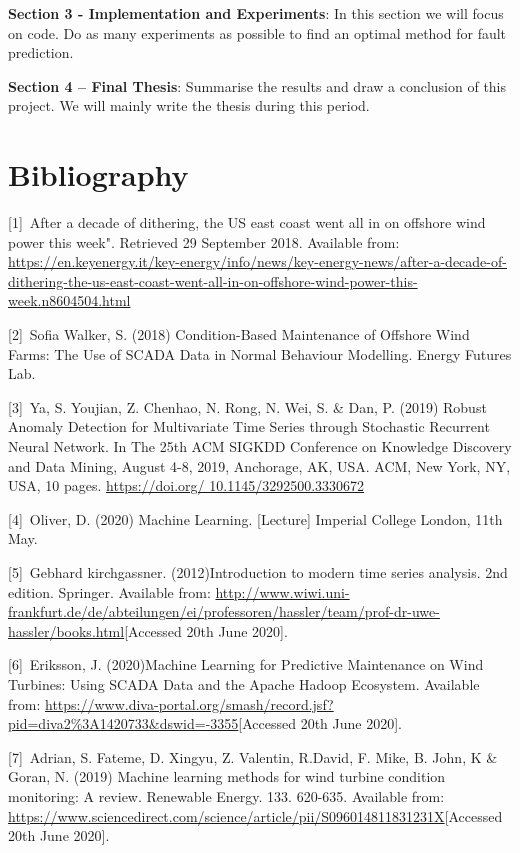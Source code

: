 \documentclass[english,a4paper,11pt]{article}
\begin{document}
\textbf{Section 3 - Implementation and Experiments}: In this section we will focus on code. Do as many experiments as possible to find an optimal method for fault prediction.

\textbf{Section 4 – Final Thesis}: Summarise the results and draw a conclusion of this project. We will mainly write the thesis during this period.

\section{Bibliography}
[1]\ After a decade of dithering, the US east coast went all in on offshore wind power this week". Retrieved 29 September 2018. Available from: \url{https://en.keyenergy.it/key-energy/info/news/key-energy-news/after-a-decade-of-dithering-the-us-east-coast-went-all-in-on-offshore-wind-power-this-week.n8604504.html}

[2]\ Sofia Walker, S. (2018) Condition-Based Maintenance of Offshore Wind Farms: The Use of SCADA Data in Normal Behaviour Modelling. Energy Futures Lab. 

[3]\ Ya, S. Youjian, Z. Chenhao, N. Rong, N. Wei, S. \& Dan, P. (2019) Robust Anomaly Detection for Multivariate Time Series through Stochastic Recurrent Neural Network. In The 25th ACM SIGKDD Conference on Knowledge Discovery and Data Mining, August 4-8, 2019, Anchorage, AK, USA. ACM, New York, NY, USA, 10 pages. \url{https://doi.org/ 10.1145/3292500.3330672}

[4]\ Oliver, D. (2020) Machine Learning. [Lecture] Imperial College London, 11th May.

[5]\ Gebhard kirchgassner. (2012)Introduction to modern time series analysis. 2nd edition. Springer. Available from: \url{http://www.wiwi.uni-frankfurt.de/de/abteilungen/ei/professoren/hassler/team/prof-dr-uwe-hassler/books.html}[Accessed 20th June 2020].

[6]\ Eriksson, J. (2020)Machine Learning for Predictive Maintenance on Wind Turbines: Using SCADA Data and the Apache Hadoop Ecosystem. Available from: \url{https://www.diva-portal.org/smash/record.jsf?pid=diva2\%3A1420733&dswid=-3355}[Accessed 20th June 2020].

[7]\ Adrian, S. Fateme, D. Xingyu, Z. Valentin, R.David, F. Mike, B. John, K \& Goran, N. (2019) Machine learning methods for wind turbine condition monitoring: A review. Renewable Energy. 133. 620-635. Available from: \url{https://www.sciencedirect.com/science/article/pii/S096014811831231X}[Accessed 20th June 2020].
\end{document}
